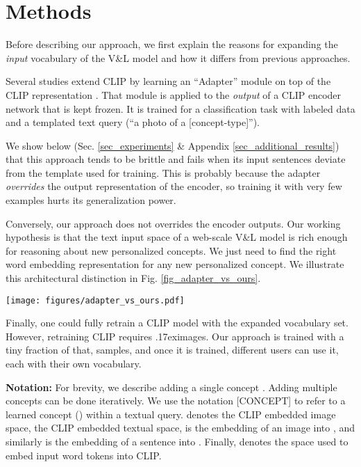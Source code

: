 \documentclass[runningheads]{llncs}
\newcommand{\tildeapprox}{{\raise.17ex\hbox{}}}
\newcommand{\figref}[1]{Fig. \ref{#1}}
\newcommand\edit[1]{#1}
\newcommand{\VL}{V\&L {}}
\newcommand{\concept}{[CONCEPT]}
\begin{document}
\section{Methods}
\label{sec:methods}

Before describing our approach, we first explain the reasons for expanding the \textit{input} vocabulary of the \VL model and how it differs from previous approaches.

Several studies extend CLIP by learning an ``Adapter'' module on top of the CLIP representation \cite{gao2021clip,skantze2021collie,zhang2021tip,ma2021simple,houlsby2019parameter}. That module is applied to the \textit{output} of a CLIP encoder network that is kept frozen. It is trained for a classification task with labeled data and a templated text query (``a photo of a [concept-type]'').

We show below (Sec. \ref{sec_experiments} \& Appendix \ref{sec_additional_results}) that this approach tends to be brittle and fails when its input sentences deviate from the template used for training. This is probably because the adapter \textit{overrides} the output representation of the encoder, so training it with very few examples hurts its generalization power.

Conversely, our approach does not overrides the encoder outputs. Our working hypothesis is that the text input space of a web-scale \VL model is rich enough for reasoning about new personalized concepts. We just need to find the right word embedding representation for any new personalized concept. We illustrate this architectural distinction in \figref{fig_adapter_vs_ours}.
\begin{SCfigure}
    \centering   
    \texttt{[image: figures/adapter\_vs\_ours.pdf]} 
    \caption{Visualization of an adapter-based approach (left) and PALAVRA (right). Adapters change CLIP's output space by appending additional layers following the encoder. Our method defines new tokens in CLIP's existing input space, leaving the output space unchanged.}
    \label{fig_adapter_vs_ours}
\end{SCfigure}

\edit{Finally, one could fully retrain a CLIP model with the expanded vocabulary set. However, retraining CLIP requires \tildeapprox  images. Our approach is trained with a tiny fraction of that,  samples, and once it is trained, different users can use it, each with their own vocabulary.}




\noindent\textbf{Notation:}
For brevity, we describe adding a single concept . Adding multiple concepts can be  done iteratively. We use the notation \concept{}  to refer to a learned concept () within a textual query.  denotes the CLIP embedded image space,  the CLIP embedded textual space,  is the embedding of an image  into , and similarly  is the embedding of a sentence  into . Finally,  denotes the space used to embed input word tokens into CLIP.
\end{document}
